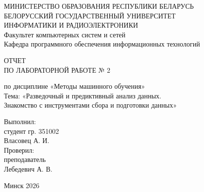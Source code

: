 \documentclass[14pt,a4paper]{extarticle}
\begin{document}
\begin{titlepage}
  \thispagestyle{empty}
  \begin{center}
    {\fontsize{11pt}{13pt}\selectfont
      МИНИСТЕРСТВО ОБРАЗОВАНИЯ РЕСПУБЛИКИ БЕЛАРУСЬ\\[4pt]
      БЕЛОРУССКИЙ ГОСУДАРСТВЕННЫЙ УНИВЕРСИТЕТ\\[4pt]
      ИНФОРМАТИКИ И РАДИОЭЛЕКТРОНИКИ\\[4pt]
      Факультет компьютерных систем и сетей\\[4pt]
      Кафедра программного обеспечения информационных технологий\par
    }

    \vspace{60mm}

    {\fontsize{16pt}{20pt}\selectfont
      ОТЧЕТ\\
      ПО ЛАБОРАТОРНОЙ РАБОТЕ № 2\par
    }
    \vspace{6mm}
    {\fontsize{14pt}{18pt}\selectfont
      по дисциплине «Методы машинного обучения»\\[8pt]
      Тема: «Разведочный и предиктивный анализ данных.\\
      Знакомство с инструментами сбора и подготовки данных»\par
    }

    \vspace{45mm}

    \begin{flushright}
      \begin{minipage}{0.48\textwidth}
        {\fontsize{13pt}{16pt}\selectfont
          Выполнил:\\[4pt]
          студент гр. 351002\\[4pt]
          Власовец А. И.\\[12pt]
          Проверил:\\[4pt]
          преподаватель\\[4pt]
          Лебедевич А. В.\par
        }
      \end{minipage}
    \end{flushright}

    \vfill

    {\fontsize{12pt}{14pt}\selectfont Минск 2026\par}
  \end{center}
\end{titlepage}
\end{document}
